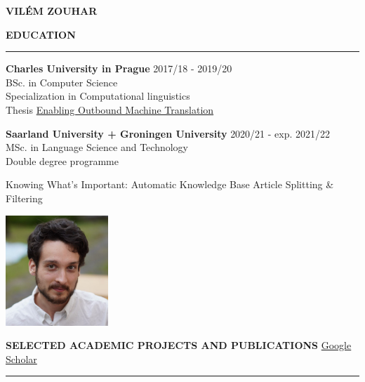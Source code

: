 \documentclass[11pt,a4paper]{article} %
\newcommand{\hSection}[1]{
    \medskip
    \MakeUppercase{\bf #1}
    \medskip
    \hrule
}
\newcommand{\hSectionI}[2]{
    \medskip
    \MakeUppercase{\bf #1}
    \hfill
    #2
    \medskip
    \hrule
}
\begin{document}
\begin{center}
    {\LARGE \bf VILÉM ZOUHAR} \\
    {\large \href{mailto:vilem.zouhar@gmail.com}{\color{black}{vilem.zouhar@gmail.com}}}
\end{center}

\vspace{\baselineskip}

\begin{minipage}{0.75\textwidth}
\hSection{Education}\vspace{0.2cm}
{\bf Charles University in Prague} \hfill {2017/18 - 2019/20} \\
BSc. in Computer Science \\
Specialization in Computational linguistics \\
Thesis \href{https://dspace.cuni.cz/bitstream/handle/20.500.11956/119400/130284419.pdf?sequence=1&isAllowed=y}{Enabling Outbound Machine Translation}

\vspace{\baselineskip}

{\bf Saarland University\hspace{-0.1cm} +\hspace{-0.1cm} Groningen University} \hfill {2020/21 - exp. 2021/22} \\
MSc. in Language Science and Technology \\
Double degree programme \\
\begin{minipage}{1.25\textwidth}
Knowing What's Important: Automatic Knowledge Base Article Splitting \& Filtering
\end{minipage}
\end{minipage}
\begin{minipage}{0.25\textwidth}
    \center
    \vspace{0.5cm}
    \hfill
    \includegraphics[width=3.85cm]{portrait.jpg}
    \vspace{1cm}
\end{minipage}

\hSectionI{Selected Academic Projects and Publications}{\href{https://scholar.google.com/citations?user=2EUDwtkAAAAJ}{Google Scholar}\hspace{-1.12cm}}
\end{document}
